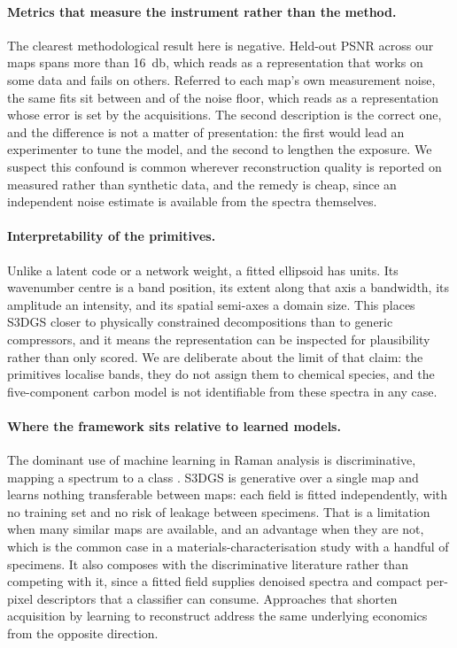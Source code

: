 \paragraph{Metrics that measure the instrument rather than the method.}
The clearest methodological result here is negative. Held-out PSNR across our
maps spans more than \SI{16}{\decibel}, which reads as a representation that
works on some data and fails on others. Referred to each map's own measurement
noise, the same fits sit between \SplatResidNoiseMin{} and
\SplatResidNoiseMax{} of the noise floor, which reads as a representation whose
error is set by the acquisitions. The second description is the correct one,
and the difference is not a matter of presentation: the first would lead an
experimenter to tune the model, and the second to lengthen the exposure. We
suspect this confound is common wherever reconstruction quality is reported on
measured rather than synthetic data, and the remedy is cheap, since an
independent noise estimate is available from the spectra themselves.

\paragraph{Interpretability of the primitives.}
Unlike a latent code or a network weight, a fitted ellipsoid has units. Its
wavenumber centre is a band position, its extent along that axis a bandwidth,
its amplitude an intensity, and its spatial semi-axes a domain size. This
places S3DGS closer to physically constrained decompositions
\cite{georgiev2024unmixing} than to generic compressors, and it means the
representation can be inspected for plausibility rather than only scored. We
are deliberate about the limit of that claim: the primitives localise bands,
they do not assign them to chemical species, and the five-component carbon
model \cite{sadezky2005carbon} is not identifiable from these spectra in any
case.

\paragraph{Where the framework sits relative to learned models.}
The dominant use of machine learning in Raman analysis is discriminative,
mapping a spectrum to a class
\cite{luo2022deep,lussier2020deep,ho2019rapid,ralbovsky2020towards}. S3DGS is
generative over a single map and learns nothing transferable between maps: each
field is fitted independently, with no training set and no risk of leakage
between specimens. That is a limitation when many similar maps are available,
and an advantage when they are not, which is the common case in a
materials-characterisation study with a handful of specimens. It also composes
with the discriminative literature rather than competing with it, since a
fitted field supplies denoised spectra and compact per-pixel descriptors that a
classifier can consume. Approaches that shorten acquisition by learning to
reconstruct \cite{horgan2021high} address the same underlying economics from
the opposite direction.

